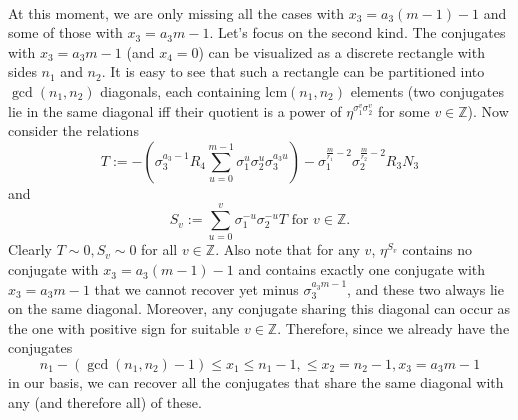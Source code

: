 \documentclass[12pt,a4paper]{article}
\newcommand{\Z}{\mathbb{Z}}
\newcommand{\lcm}{\mathrm{lcm}}
\begin{document}
\paragraph*{}
At this moment, we are only missing all the cases with $x_3=a_3(m-1)-1$ and some of those with $x_3=a_3m-1$. 
Let's focus on the second kind. The conjugates with $x_3=a_3m-1$ (and $x_4=0$) can be visualized as a discrete rectangle with sides $n_1$ and $n_2$. It is easy to see that such a rectangle can be partitioned into $\gcd(n_1,n_2)$ diagonals, each containing $\lcm(n_1,n_2)$ elements (two conjugates lie in the same diagonal iff their quotient is a power of $\eta^{\sigma_1^v\sigma_2^v}$ for some $v\in\Z$). Now consider the relations $$T:=-\left(\sigma_3^{a_3-1}R_4\sum_{u=0}^{m-1}\sigma_1^{u}\sigma_2^{u}\sigma_3^{a_3u}\right)-\sigma_1^{\frac{m}{r_1}-2}\sigma_2^{\frac{m}{r_2}-2} R_3N_3$$
and
$$S_v:=\sum_{u=0}^{v}\sigma_1^{-u}\sigma_2^{-u}T \text{ for } v\in\Z.$$
Clearly $T\sim 0, S_v\sim 0$ for all $v\in\Z$. Also note that for any $v$, $\eta^{S_v}$ contains no conjugate with $x_3=a_3(m-1)-1$ and contains exactly one conjugate with $x_3=a_3m-1$ that we cannot recover yet minus $\sigma_3^{a_3m-1}$, and these two always lie on the same diagonal. Moreover, any conjugate sharing this diagonal can occur as the one with positive sign for suitable $v\in\Z$. Therefore, since we already have the conjugates $$n_1-(\gcd\left(n_1,n_2\right)-1)\leq x_1\leq n_1-1, \leq x_2=n_2-1, x_3=a_3m-1$$ in our basis, we can recover all the conjugates that share the same diagonal with any (and therefore all) of these.
\end{document}
